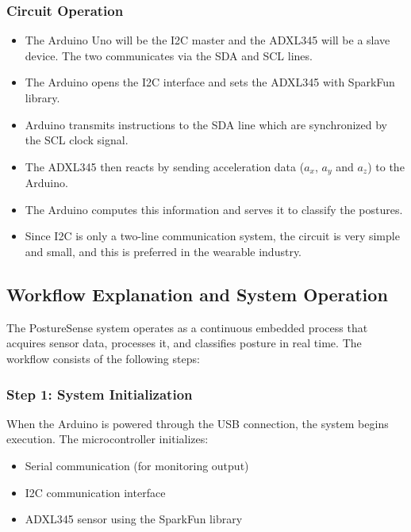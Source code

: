 \documentclass[conference]{IEEEtran}
\begin{document}
\subsubsection{Circuit Operation}

\begin{itemize}[leftmargin=*,noitemsep]
    \item The Arduino Uno will be the I2C master and the ADXL345 will be a slave device. 
    The two communicates via the SDA and SCL lines.

    \item The Arduino opens the I2C interface and sets the ADXL345 with SparkFun library.

    \item Arduino transmits instructions to the SDA line which are synchronized by the SCL 
    clock signal.

    \item The ADXL345 then reacts by sending acceleration data ($a_x$, $a_y$ and $a_z$) to the 
    Arduino.

    \item The Arduino computes this information and serves it to classify the postures.

    \item Since I2C is only a two-line communication system, the circuit is very simple and 
    small, and this is preferred in the wearable industry.
\end{itemize}

\subsection{Workflow Explanation and System Operation}

The PostureSense system operates as a continuous embedded process that acquires sensor 
data, processes it, and classifies posture in real time. The workflow consists of the 
following steps:

\subsubsection{Step 1: System Initialization}

When the Arduino is powered through the USB connection, the system begins execution. 
The microcontroller initializes:

\begin{itemize}[leftmargin=*,noitemsep]
    \item Serial communication (for monitoring output)
    \item I2C communication interface
    \item ADXL345 sensor using the SparkFun library
\end{itemize}
\end{document}
